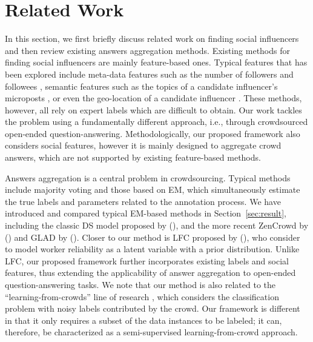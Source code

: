 \section{Related Work}

In this section, we first briefly discuss related work on finding social influencers and then review existing answers aggregation methods. Existing methods for finding social influencers are mainly feature-based ones. Typical features that has been explored include meta-data features such as the number of followers and followees \cite{Lehmann2013,Cheng2014}, semantic features such as the topics of a candidate influencer's microposts \cite{riahi2012finding,wei2016learning}, or even the geo-location of a candidate influencer \cite{Cheng2014} . These methods, however, all rely on expert labels which are difficult to obtain. Our work tackles the problem using a fundamentally different approach, i.e., through crowdsourced open-ended question-answering. Methodologically, our proposed framework also considers social features, however it is mainly designed to aggregate crowd answers, which are not supported by existing feature-based methods.


Answers aggregation is a central problem in crowdsourcing. Typical methods include majority voting \cite{sheng2008get} and those based on EM, which simultaneously estimate the true labels and parameters related to the annotation process. We have introduced and compared typical EM-based methods in Section~\ref{sec:result}, including the classic DS model proposed by \citeauthor{dawid1979maximum} (\citeyear{dawid1979maximum}), and the more recent ZenCrowd by \citeauthor{demartini2012zencrowd} (\citeyear{demartini2012zencrowd}) and GLAD by \citeauthor{whitehill2009whose} (\citeyear{whitehill2009whose}). Closer to our method is LFC proposed by \citeauthor{raykar2010learning} (\citeyear{raykar2010learning}), who consider to model worker reliability as a latent variable with a prior distribution. Unlike LFC, our proposed framework further incorporates existing labels and social features, thus extending the applicability of answer aggregation to open-ended question-answering tasks. We note that our method is also related to the ``learning-from-crowds'' line of research \cite{raykar2010learning,tian2012learning,yang2018leveraging}, which considers the classification problem with noisy labels contributed by the crowd. Our framework is different in that it only requires a subset of the data instances to be labeled; it can, therefore, be characterized as a semi-supervised learning-from-crowd approach. 